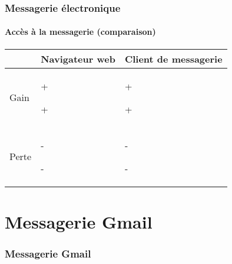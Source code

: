 \documentclass{beamer}
\begin{document}
\begin{frame}
\frametitle{Messagerie électronique}
\framesubtitle{Accès à la messagerie (comparaison)}

\begin{tabular}{p{}p{}p{}}
	\hline\hline
	& Navigateur web & Client de messagerie \\
	\hline\hline
	
	Gain &
	+  
	
	+ 
	
	& 
	+ 
	
	+ 
	\\
	
	\hline
	Perte &
	- 
	
	- 
	&
	- 
	
	- 
	\\
	\hline\hline
\end{tabular}

\end{frame}



\section{Messagerie Gmail}

\begin{frame}
\frametitle{Messagerie Gmail}

\end{frame}



%
% 
\end{document}
